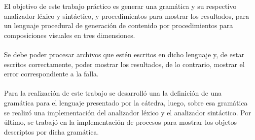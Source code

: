 El objetivo de este trabajo pr\'actico es generar una gram\'atica y su respectivo analizador l\'exico y sint\'actico, y procedimientos para mostrar los resultados, para un lenguaje procedural de generaci\'on de contenido por procedimientos para composiciones visuales en tres dimensiones. \\
\\
Se debe poder procesar archivos que est\'en escritos en dicho lenguaje y, de estar escritos correctamente, poder mostrar los resultados, de lo contrario, mostrar el error correspondiente a la falla. \\
\\
Para la realizaci\'on de este trabajo se desarroll\'o una la definici\'on de una gram\'atica para el lenguaje presentado por la c\'atedra, luego, sobre esa gram\'atica se realiz\'o una implementaci\'on del analizador l\'exico y el analizador sint\'actico. Por \'ultimo, se trabaj\'o en la implementaci\'on de procesos para mostrar los objetos descriptos por dicha gram\'atica.\\
